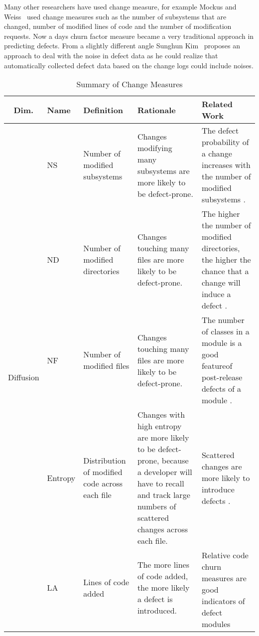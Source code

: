 \documentclass[10pt, conference]{IEEEtran}
\begin{document}
Many other researchers have used change measure, for example Mockus and Weiss~\cite{Mockus2000Bell} used change measures such as the number of subsystems that are changed, number of modified lines of code and the number of modification requests. Now a days churn factor measure became a very traditional approach in predicting defects. From a slightly different angle Sunghun Kim~\cite{Kim2011ICSE} proposes an approach to deal with the noise in defect data as he could realize that automatically collected defect data based on the change logs could include noises.

\begin{table*}[t]
	\centering
	\caption{Summary of Change Measures}
	\begin{tabular}{|c|l|p{2.5cm}|p{5.5cm}|p{5.25cm}|}
		\hline Dim. & Name & Definition & Rationale & Related Work \\ 
		\hline \multirow{14}{*}{\begin{sideways}Diffusion\end{sideways}} & NS & Number of modified subsystems  & Changes modifying many subsystems are more likely to be defect-prone. & The defect probability of a change increases with the number of modified subsystems \cite{Mockus2000Bell}. \\ \cline{2-5}  
		& ND & Number of modified directories & Changes touching many files are more likely to be defect-prone. & The higher the number of modified directories, the higher the chance that a change will induce a defect \cite{Mockus2000Bell}. \\ \cline{2-5}  
		& NF & Number of modified files & Changes touching many files are more likely to be defect-prone. & The number of classes in a module is a good featureof post-release defects of a module \cite{Nagappan2006ICSE}. \\ \cline{2-5} 
		& Entropy & Distribution of modified code across each file & Changes with high entropy are more likely to be defect-prone, because a developer will have to recall and track large numbers of scattered changes across each file. & Scattered changes are more likely to introduce defects \cite{DAmbross2010MSR, Hassan2009ICSE}. \\ 
		\hline \multirow{4}{*}{\begin{sideways}Size\end{sideways}} & LA & Lines of code added & The more lines of code added, the more likely a defect is introduced. & \multirow{2}{5.25cm}{Relative code churn measures are good indicators of defect modules \cite{Moser2008ICSE, Nagappan2005ICSE}}. \\ \cline{2-4} 

\end{tabular}
\end{table*}
\end{document}
